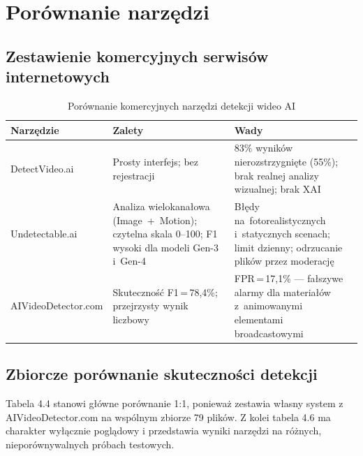\section{Por\'{o}wnanie narz\k{e}dzi}
\label{sec:porownanie}

\subsection{Zestawienie komercyjnych serwis\'{o}w internetowych}
\label{sec:zalety_wady_internet}

\begin{table}[htbp]
\centering
{\setlength{\tabcolsep}{6pt}\renewcommand{\arraystretch}{1.35}
\caption{Por\'{o}wnanie komercyjnych narz\k{e}dzi detekcji wideo AI}
\label{tab:porownanie_narzedzi}
\small
\begin{tabular}{L{3.0cm}L{5.2cm}L{5.2cm}}
\toprule
\textbf{Narz\k{e}dzie} & \textbf{Zalety} & \textbf{Wady} \\
\midrule
DetectVideo.ai &
Prosty interfejs; bez rejestracji &
83\% wynik\'{o}w nierozstrzygni\k{e}te (55\%);
brak realnej analizy wizualnej;
brak XAI \\
\addlinespace[4pt]
Undetectable.ai &
Analiza wielokana\l{}owa (Image~+~Motion);
czytelna skala 0--100;
F1 wysoki dla modeli Gen-3 i~Gen-4 &
B\l{}\k{e}dy na~fotorealistycznych i~statycznych scenach;
limit dzienny; odrzucanie plik\'{o}w przez moderacj\k{e} \\
\addlinespace[4pt]
AIVideoDetector.com &
Skuteczno\'{s}\'{c} F1\,=\,78{,}4\%;
przejrzysty wynik liczbowy &
FPR\,=\,17{,}1\% --- fa\l{}szywe alarmy
dla materia\l{}\'{o}w z~animowanymi elementami broadcastowymi \\
\bottomrule
\end{tabular}}
\end{table}

\subsection{Zbiorcze por\'{o}wnanie skuteczno\'{s}ci detekcji}
\label{sec:porownanie_zbiorcze}

Tabela 4.4 stanowi g\l{}ówne porównanie 1:1, poniewa\.{z} zestawia własny system
z AIVideoDetector.com na wspólnym zbiorze 79 plików. Z kolei tabela 4.6 ma
charakter wyłącznie pogl\k{a}dowy i przedstawia wyniki narz\k{e}dzi na różnych,
nieporównywalnych próbach testowych.

